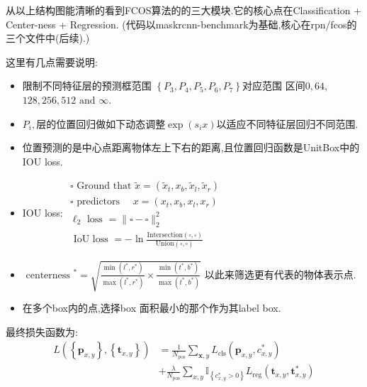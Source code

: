 \documentclass[UTF8]{ctexart}
\begin{document}
从以上结构图能清晰的看到FCOS算法的的三大模块.它的核心点在Classification + Center-ness + Regression.
(代码以maskrcnn-benchmark为基础,核心在rpn/fcos的三个文件中(后续).)

这里有几点需要说明:
\begin{itemize}
    \item 限制不同特征层的预测框范围
    $\left\{P_{3}, P_{4}, P_{5}, P_{6}, P_{7}\right\}$对应范围
    区间$0,64,$ $128,256,512 \text { and } \infty$.
    
    \item $P_i, \text{层的位置回归做如下动态调整}\exp \left(s_{i} x\right)$以适应不同特征层回归不同范围.
    
    \item 位置预测的是中心点距离物体左上下右的距离,且位置回归函数是UnitBox中的IOU loss.
    
    \item IOU loss:
    $
	\begin{array}{l}{\square \text { Ground that } \tilde{x}=\left(\tilde{x}_{t}, x_{b}, \tilde{x}_{l},
		\tilde{x}_{r}\right)} \\ {\square \text { predictors } \quad x=\left(x_{t}, x_{b}, x_{l}, x_{r}\right)} \\
		{\ell_{2} \text { loss }=\|\square-\square\|_{2}^{2}} \\ 
	{\text { IoU loss }=-\ln \frac{\text {Intersection}(\square, \square)}{\text {Union}(\square, \square)}}
	\end{array}$
    
    \item $\text { centerness }^{*}=\sqrt{\frac{\min \left(l^{*}, r^{*}\right)}{\max \left(l^{*}, r^{*}\right)} \times \frac{\min \left(t^{*}, b^{*}\right)}{\max \left(t^{*}, b^{*}\right)}}$ 以此来筛选更有代表的物体表示点.
    
    \item 在多个box内的点,选择box 面积最小的那个作为其label box.
    
\end{itemize}

最终损失函数为:
$$
\begin{aligned} L\left(\left\{\boldsymbol{p}_{x, y}\right\},
\left\{\boldsymbol{t}_{x, y}\right\}\right) &=\frac{1}{N_{\mathrm{pos}}} 
\sum_{\boldsymbol{x}, y} L_{\mathrm{cls}}\left(\boldsymbol{p}_{x, y}, c_{x, y}^{*}\right) 
\\ &+\frac{\lambda}{N_{\mathrm{pos}}} \sum_{x, y} \mathbb{I}_{\left\{c_{x, y}^{*}>0\right\}} 
L_{\mathrm{reg}}\left(\boldsymbol{t}_{x, y}, \boldsymbol{t}_{x, y}^{*}\right)
 \end{aligned}
$$
\end{document}
